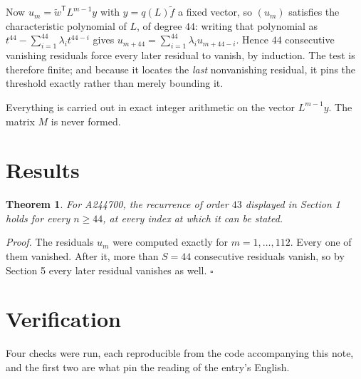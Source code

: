\documentclass[11pt]{article}
\newtheorem{theorem}{Theorem}
\theoremstyle{definition}
\begin{document}
Now $u_m = \tilde w^{\mathsf T} L^{m-1} y$ with $y = q(L)\tilde f$ a fixed vector, so $(u_m)$ satisfies the characteristic polynomial of $L$, of degree $44$: writing that polynomial as $t^{44} - \sum_{i=1}^{44} \lambda_i t^{44-i}$ gives $u_{m+44} = \sum_{i=1}^{44} \lambda_i u_{m+44-i}$. Hence $44$ consecutive vanishing residuals force every later residual to vanish, by induction. The test is therefore finite; and because it locates the {\itshape last} nonvanishing residual, it pins the threshold exactly rather than merely bounding it.

Everything is carried out in exact integer arithmetic on the vector $L^{m-1}y$. The matrix $M$ is never formed.

\section{Results}

\begin{theorem} For A244700, the recurrence of order $43$ displayed in Section 1 holds for every $n \ge 44$, at every index at which it can be stated.\end{theorem}

{\itshape Proof.} The residuals $u_m$ were computed exactly for $m = 1,\dots,112$. Every one of them vanished. After it, more than $S = 44$ consecutive residuals vanish, so by Section 5 every later residual vanishes as well. $\square$

\section{Verification}

Four checks were run, each reproducible from the code accompanying this note, and the first two are what pin the reading of the entry's English.
\end{document}
